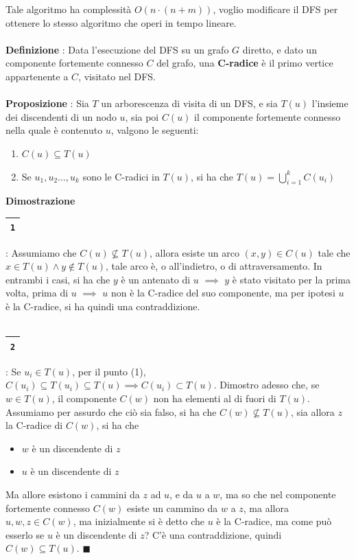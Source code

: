 \documentclass[12pt, letterpaper]{article}
\newcommand{\acc}{\\\hphantom{}\\}
\newcommand{\boxedMath}[1]{\begin{tabular}{|c|}\hline \texttt{#1} \\ \hline\end{tabular} :}
\begin{document}
Tale algoritmo ha complessità $O(n\cdot(n+m))$, voglio modificare il DFS per ottenere lo stesso algoritmo che operi in
tempo lineare.\acc
\textbf{Definizione} : Data l'esecuzione del DFS su un grafo $G$ diretto, e dato un componente fortemente
connesso $C$ del grafo, una \textbf{C-radice} è il primo vertice appartenente a $C$, visitato nel DFS.\acc
\textbf{Proposizione} : Sia $T$ un arborescenza di visita di un DFS, e sia $T(u)$ l'insieme dei discendenti di un nodo
$u$, sia poi $C(u)$ il componente fortemente connesso nella quale è contenuto $u$, valgono le seguenti:\begin{enumerate}
    \item $C(u)\subseteq T(u)$
    \item Se $u_1,u_2\dots,u_k$ sono le C-radici in $T(u)$, si ha che $\displaystyle T(u)=\bigcup_{i=1}^k C(u_i)$
\end{enumerate}
\textbf{Dimostrazione} \boxedMath{1} Assumiamo che $C(u)\nsubseteq  T(u)$, allora esiste un arco $(x,y)\in C(u)$ tale
che $x\in T(u)\land y\notin T(u)$, tale arco è, o all'indietro, o di attraversamento. In entrambi i casi, si ha che
$y$ è un antenato di $u$ $\implies$ $y$ è stato visitato per la prima volta, prima di $u$ $\implies$ $u$ non è la
C-radice del suo componente, ma per ipotesi $u$ è la C-radice, si ha quindi una contraddizione.\acc
\boxedMath{2} Se $u_i\in T(u)$, per il punto (1), $C(u_i)\subseteq T(u_i) \subseteq T(u)\implies C(u_i)\subset T(u)$. Dimostro
adesso che,
se $w\in T(u)$, il componente $C(w)$ non ha elementi al di fuori di $T(u)$. Assumiamo per assurdo che ciò sia falso, si ha
che $C(w)\nsubseteq T(u)$, sia allora $z$ la C-radice di $C(w)$, si ha che  \begin{itemize}
    \item $w$ è un discendente di $z$
    \item $u$ è un discendente di $z$
\end{itemize}
Ma allore esistono i cammini da $z$ ad $u$, e da $u$ a $w$, ma so che nel componente fortemente connesso $C(w)$ esiste
un cammino da $w$ a $z$, ma allora $u,w,z\in C(w)$, ma inizialmente si è detto che $u$ è la C-radice, ma come può esserlo se
$u$ è un discendente di $z$? C'è una contraddizione, quindi $C(w)\subseteq T(u)$. $\blacksquare$
\end{document}
